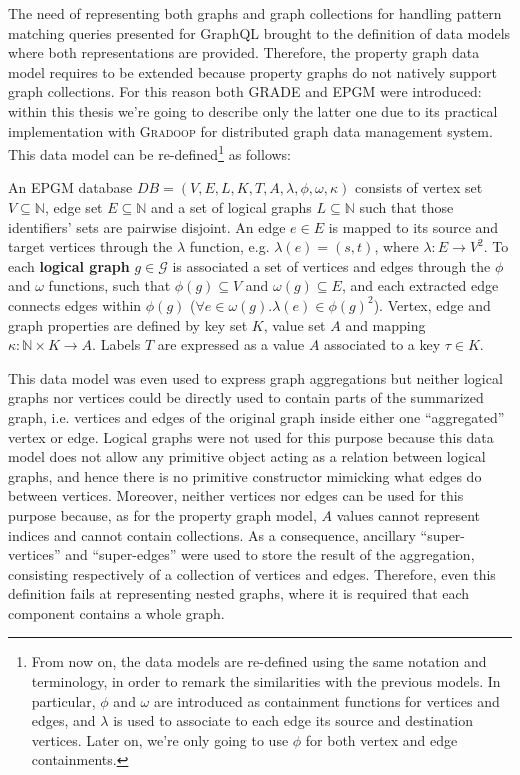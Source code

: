 \label{php:EPGM}
The need of representing both graphs and graph collections for handling pattern matching queries presented for GraphQL \cite{He2007} brought to the definition of data models where both representations are provided. Therefore, the property graph data model requires to be extended because property graphs do not natively support graph collections. For this reason both GRADE \cite{GRAD,Ghrab2015} and EPGM \cite{apacheflink,JunghannsPR17} were introduced: within this thesis we're going to describe only the latter one due to its practical implementation with \textsc{Gradoop} for distributed graph data management system. This data model can be re-defined\footnote{From now on, the data models are re-defined using the same notation and terminology, in order to remark the similarities with the previous models. In particular, $\phi$ and $\omega$ are introduced as containment functions for vertices and edges, and $\lambda$ is used to associate to each edge its source and destination vertices. Later on, we're only going to use $\phi$ for both vertex and edge containments.} as follows:

\begin{definition}
	An EPGM database $DB = ( V, E, L, K, T, A,\lambda,\phi,\omega, \kappa )$ consists of vertex set $V\subseteq \mathbb{N}$, edge set $E\subseteq \mathbb{N}$ and a set of logical graphs $L\subseteq \mathbb{N}$ such that those identifiers' sets are  pairwise disjoint. An edge $e\in E$ is mapped to its source and target vertices through the $\lambda$ function, e.g. $\lambda(e) = ( s,t )$, where $\lambda\colon E\to V^2$.  To each \textbf{logical graph} $g \in\mathcal{G}$ is  associated a set of vertices and edges through the $\phi$ and $\omega$ functions, such that $\phi(g)\subseteq V$ and $\omega(g)\subseteq E$, and each extracted edge connects edges within $\phi(g)$ ($\forall e\in \omega(g).\lambda(e)\in\phi(g)^2$). Vertex, edge and graph properties are defined by key set $K$, value set $A$ and mapping $\kappa : \mathbb{N} \times K \rightarrow A$. Labels $T$ are expressed as a value $A$ associated to a key $\tau\in K$.
\end{definition}

This data model was even used to express graph aggregations but neither logical graphs nor vertices could be directly used to contain parts of the summarized graph, i.e. vertices and edges of the original graph inside either one ``aggregated'' vertex or edge. Logical graphs were not used for this purpose because this data model does not allow any primitive object acting as a relation between logical graphs, and hence there is no primitive constructor mimicking what edges do between vertices. Moreover, neither vertices nor edges can be used for this purpose because, as for the property graph model, $A$ values cannot represent indices and cannot contain collections. As a consequence, ancillary ``super-vertices'' and ``super-edges'' were used to store the result of the aggregation, consisting respectively of a collection of vertices and edges. Therefore, even this definition fails at representing nested graphs, where it is required that each component contains a whole graph.